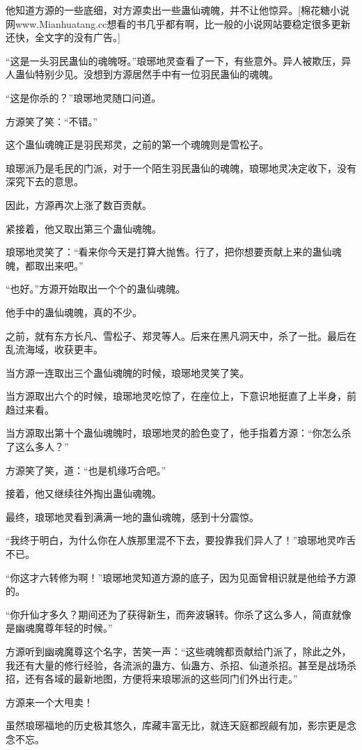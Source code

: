 \begin{this_body}
他知道方源的一些底细，对方源卖出一些蛊仙魂魄，并不让他惊异。[棉花糖小说网www.Mianhuatang.cc想看的书几乎都有啊，比一般的小说网站要稳定很多更新还快，全文字的没有广告。]

“这是一头羽民蛊仙的魂魄呀。”琅琊地灵查看了一下，有些意外。异人被欺压，异人蛊仙特别少见。没想到方源居然手中有一位羽民蛊仙的魂魄。

“这是你杀的？”琅琊地灵随口问道。

方源笑了笑：“不错。”

这个蛊仙魂魄正是羽民郑灵，之前的第一个魂魄则是雪松子。

琅琊派乃是毛民的门派，对于一个陌生羽民蛊仙的魂魄，琅琊地灵决定收下，没有深究下去的意思。

因此，方源再次上涨了数百贡献。

紧接着，他又取出第三个蛊仙魂魄。

琅琊地灵笑了：“看来你今天是打算大抛售。行了，把你想要贡献上来的蛊仙魂魄，都取出来吧。”

“也好。”方源开始取出一个个的蛊仙魂魄。

他手中的蛊仙魂魄，真的不少。

之前，就有东方长凡、雪松子、郑灵等人。后来在黑凡洞天中，杀了一批。最后在乱流海域，收获更丰。

当方源一连取出三个蛊仙魂魄的时候，琅琊地灵笑了笑。

当方源取出六个的时候，琅琊地灵吃惊了，在座位上，下意识地挺直了上半身，前趋过来看。

当方源取出第十个蛊仙魂魄时，琅琊地灵的脸色变了，他手指着方源：“你怎么杀了这么多人？”

方源笑了笑，道：“也是机缘巧合吧。”

接着，他又继续往外掏出蛊仙魂魄。

最终，琅琊地灵看到满满一地的蛊仙魂魄，感到十分震惊。

“我终于明白，为什么你在人族那里混不下去，要投靠我们异人了！”琅琊地灵咋舌不已。

“你这才六转修为啊！”琅琊地灵知道方源的底子，因为见面曾相识就是他给予方源的。

“你升仙才多久？期间还为了获得新生，而奔波辗转。你杀了这么多人，简直就像是幽魂魔尊年轻的时候。”

方源听到幽魂魔尊这个名字，苦笑一声：“这些魂魄都贡献给门派了，除此之外，我还有大量的修行经验，各流派的蛊方、仙蛊方、杀招、仙道杀招。甚至是战场杀招，还有各域的最新地图，方便将来琅琊派的这些同门们外出行走。”

方源来一个大甩卖！

虽然琅琊福地的历史极其悠久，库藏丰富无比，就连天庭都觊觎有加，影宗更是念念不忘。


\end{this_body}
